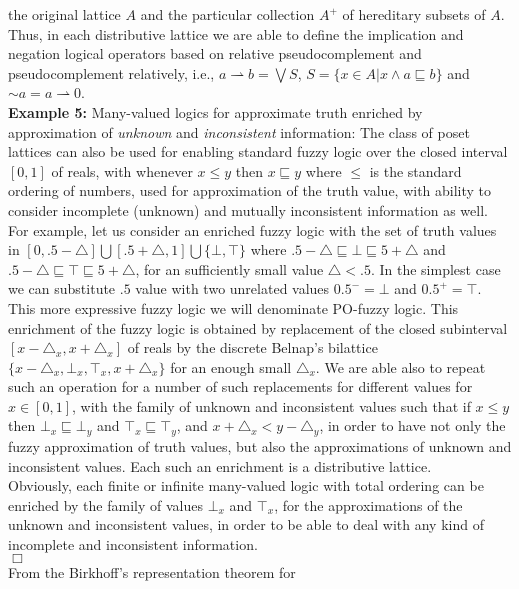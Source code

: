 \documentclass[10pt,twocolumn]{article}
\begin{document}
the original lattice $A$ and the particular collection $A^+$ of
hereditary subsets of $A$. Thus, in each  distributive lattice we
are able to define the implication and negation logical operators
based on relative pseudocomplement and pseudocomplement relatively,
i.e., $a\rightharpoonup b = \bigvee S$,  $S =\{x\in A | x \wedge a
\sqsubseteq b\}$ and  $\sim a = a
\rightharpoonup 0$. \\
 \textbf{Example 5:} Many-valued logics for approximate truth enriched by approximation of \emph{unknown} and \emph{inconsistent} information:
The class of poset
lattices can also be used  for enabling standard fuzzy logic over
the closed interval $[0,1]$ of reals, with whenever $x \leq y$ then
$x \sqsubseteq y$ where $\leq$ is the standard ordering of numbers,
used for approximation of the truth value, with ability to consider
incomplete (unknown) and mutually inconsistent information as well.
For example, let us consider an enriched fuzzy logic with the set of
truth values in $[0, .5-\triangle] \bigcup[ .5+\triangle,1]\bigcup
\{\bot, \top\}$ where $.5-\triangle \sqsubseteq \bot \sqsubseteq
5+\triangle$ and $.5-\triangle \sqsubseteq \top \sqsubseteq
5+\triangle$, for an sufficiently small value $\triangle < .5$. In
the simplest case we can substitute $.5$ value with two unrelated
values $0.5^- = \bot$ and $0.5^+ = \top$. This more expressive fuzzy
logic we will denominate PO-fuzzy logic. This enrichment of the
fuzzy logic is obtained by replacement of the closed subinterval
$[x-\triangle_x, x+\triangle_x]$ of reals by the discrete Belnap's
bilattice $\{x-\triangle_x, \bot_x, \top_x, x+\triangle_x\}$ for an
enough small $\triangle_x$. We are able also to repeat such an
operation for a number of such replacements for different values for
$x \in [0,1]$, with the family of unknown and inconsistent values
such that if $x \leq y$ then $\bot_x \sqsubseteq \bot_y$ and $\top_x
\sqsubseteq \top_y$, and $x+\triangle_x < y-\triangle_y$, in order
to have not only the fuzzy approximation of truth values, but also
the approximations of unknown and
inconsistent values. Each such an enrichment is a distributive lattice.\\
Obviously, each finite or infinite many-valued logic with total
ordering can be enriched by the family of values $\bot_x$ and
$\top_x$,  for the approximations of the unknown and inconsistent
values, in order to be able to deal with any kind of incomplete and
inconsistent information.
\\$\Box$\\
From the Birkhoff's representation theorem \cite{Birkh40} for
\end{document}
